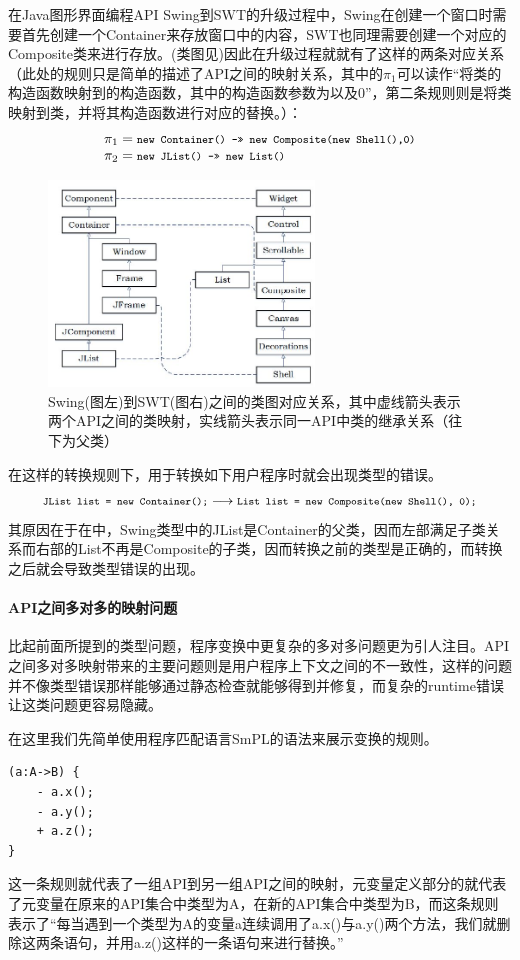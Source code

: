 在Java图形界面编程API Swing到SWT的升级过程中，Swing在创建一个窗口时需要首先创建一个Container来存放窗口中的内容，SWT也同理需要创建一个对应的Composite类来进行存放。(类图见)因此在升级过程就就有了这样的两条对应关系（此处的规则只是简单的描述了API之间的映射关系，其中的$\pi_1$可以读作“将类的构造函数映射到的构造函数，其中的构造函数参数为以及0”，第二条规则则是将类映射到类，并将其构造函数进行对应的替换。）：
\[
\begin{array}{ll}
	\pi_1=\texttt{\footnotesize new Container() ->> new Composite(new Shell(),0)}\\
	\pi_2=\texttt{\footnotesize new JList() ->> new List()}
\end{array}
\]
\begin{figure}[ht]
\centering
\includegraphics[width=200pt]{fig//swing2swt_class.JPG}
\caption{Swing(图左)到SWT(图右)之间的类图对应关系，其中虚线箭头表示两个API之间的类映射，实线箭头表示同一API中类的继承关系（往下为父类）}
\label{swing2swtfig}
\end{figure}
在这样的转换规则下，用于转换如下用户程序时就会出现类型的错误。
\[
\texttt{\footnotesize JList list = new Container();} \longrightarrow \texttt{\footnotesize List list = new Composite(new Shell(), 0);}
\]
其原因在于在中，Swing类型中的JList是Container的父类，因而左部满足子类关系而右部的List不再是Composite的子类，因而转换之前的类型是正确的，而转换之后就会导致类型错误的出现。

\paragraph{API之间多对多的映射问题}
比起前面所提到的类型问题，程序变换中更复杂的多对多问题更为引人注目。API之间多对多映射带来的主要问题则是用户程序上下文之间的不一致性，这样的问题并不像类型错误那样能够通过静态检查就能够得到并修复，而复杂的runtime错误让这类问题更容易隐藏。

在这里我们先简单使用程序匹配语言SmPL\cite{spatch}的语法来展示变换的规则。
\begin{center}
\begin{smpage}{0.25\columnwidth}
\begin{lstlisting}[style=patl]
(a:A->B) {
	- a.x();
	- a.y();
	+ a.z();
}
\end{lstlisting}
\end{smpage}
\end{center}
这一条规则就代表了一组API到另一组API之间的映射，元变量定义部分的就代表了元变量在原来的API集合中类型为A，在新的API集合中类型为B，而这条规则表示了“每当遇到一个类型为A的变量a连续调用了a.x()与a.y()两个方法，我们就删除这两条语句，并用a.z()这样的一条语句来进行替换。”

